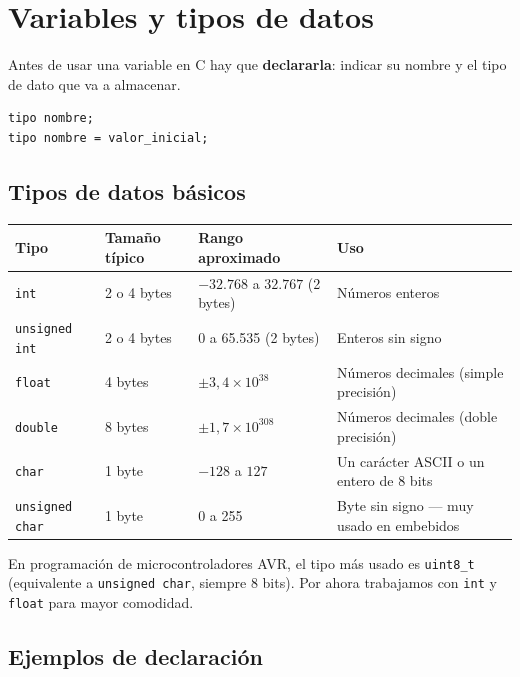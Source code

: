 \section{Variables y tipos de datos}

Antes de usar una variable en C hay que \textbf{declararla}: indicar su nombre y el tipo de dato que va a almacenar.

\begin{lstlisting}[style=estilo-c]
tipo nombre;
tipo nombre = valor_inicial;
\end{lstlisting}

\subsection{Tipos de datos básicos}

\begin{table}[H]
\centering
\begin{tabular}{llp{5cm}l}
\toprule
Tipo & Tamaño típico & Rango aproximado & Uso \\
\midrule
\texttt{int} & 2 o 4 bytes & $-32.768$ a $32.767$ (2 bytes) & Números enteros \\
\texttt{unsigned int} & 2 o 4 bytes & 0 a 65.535 (2 bytes) & Enteros sin signo \\
\texttt{float} & 4 bytes & $\pm 3{,}4 \times 10^{38}$ & Números decimales (simple precisión) \\
\texttt{double} & 8 bytes & $\pm 1{,}7 \times 10^{308}$ & Números decimales (doble precisión) \\
\texttt{char} & 1 byte & $-128$ a $127$ & Un carácter ASCII o un entero de 8 bits \\
\texttt{unsigned char} & 1 byte & 0 a 255 & Byte sin signo --- muy usado en embebidos \\
\bottomrule
\end{tabular}
\end{table}

\begin{notabox}
En programación de microcontroladores AVR, el tipo más usado es \texttt{uint8\_t} (equivalente a \texttt{unsigned char}, siempre 8 bits). Por ahora trabajamos con \texttt{int} y \texttt{float} para mayor comodidad.
\end{notabox}

\subsection{Ejemplos de declaración}

